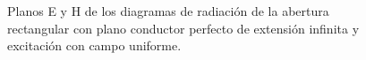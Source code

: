 \begin{figure} [H]
\centering 
{}
\hspace{5mm}
\caption{Planos E y H de los diagramas de radiación de la abertura rectangular con plano conductor perfecto de extensión infinita y excitación con campo uniforme.}
\label{grup_fig_estudio:1}
\end{figure}
